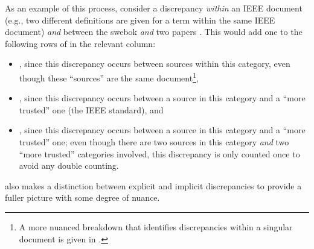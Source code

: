 As an example of this process, consider a discrepancy \emph{within} an IEEE
document (e.g., two different definitions are given for a term within the same
IEEE document) \emph{and} between the \acs{swebok} \emph{and} two papers%
. This would add one to the following rows of
 in the relevant column:

\begin{itemize}
    \item \textbf{}, since this discrepancy occurs between
          sources within this category, even though these ``sources'' are the
          same document\footnote{A more nuanced breakdown that identifies
              discrepancies within a singular document is given in
              .},
    \item \textbf{}, since this discrepancy occurs between a
          source in this category and a ``more trusted'' one
          (the IEEE standard), and
    \item \textbf{}, since this discrepancy occurs between a
          source in this category and a ``more trusted'' one; even though there
          are two sources in this category \emph{and} two ``more trusted''
          categories involved, this discrepancy is only counted once to avoid
          any double counting.
\end{itemize}

 also makes a distinction between explicit and implicit%
discrepancies to provide a fuller picture with some degree of nuance.